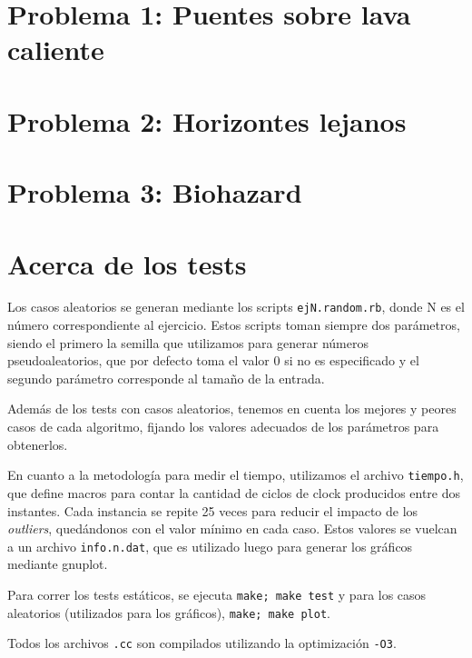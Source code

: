 \documentclass[a4paper]{article}
\begin{document}
\newpage

\section{Problema 1: Puentes sobre lava caliente}


\newpage

\section{Problema 2: Horizontes lejanos}


\newpage

\section{Problema 3: Biohazard}


\newpage
\section{Acerca de los tests}
Los casos aleatorios se generan mediante los scripts \verb|ejN.random.rb|, donde 
N es el número correspondiente al ejercicio. Estos scripts toman siempre dos parámetros, 
siendo el primero la semilla que utilizamos para generar números pseudoaleatorios, que 
por defecto toma el valor 0 si no es especificado y el segundo parámetro corresponde 
al tamaño de la entrada. 

Además de los tests con casos aleatorios, tenemos en cuenta los mejores y peores 
casos de cada algoritmo, fijando los valores adecuados de los parámetros para 
obtenerlos.

En cuanto a la metodología para medir el tiempo, utilizamos el archivo \verb|tiempo.h|, 
que define macros para contar la cantidad de ciclos de clock producidos entre dos instantes. 
Cada instancia se repite 25 veces para reducir el impacto de los \textit{outliers}, quedándonos 
con el valor mínimo en cada caso. Estos valores se vuelcan a un archivo \verb|info.n.dat|, que 
es utilizado luego para generar los gráficos mediante gnuplot.

Para correr los tests estáticos, se ejecuta \verb|make; make test| y para los 
casos aleatorios (utilizados para los gráficos), \verb|make; make plot|. 

Todos los archivos \verb|.cc| son compilados utilizando la optimización \verb|-O3|. 
  

\newpage
\end{document}
